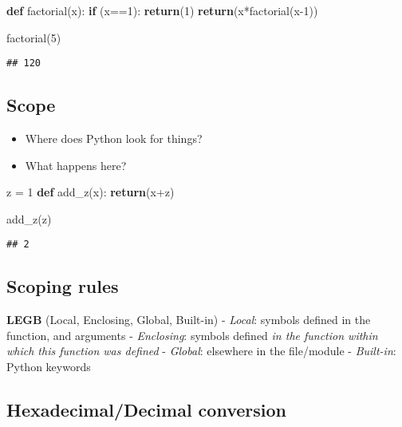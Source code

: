 \documentclass[]{tufte-handout}
\newenvironment{Shaded}{}{}
\newcommand{\KeywordTok}[1]{\textcolor[rgb]{0.00,0.44,0.13}{\textbf{{#1}}}}
\newcommand{\DecValTok}[1]{\textcolor[rgb]{0.25,0.63,0.44}{{#1}}}
\newcommand{\ControlFlowTok}[1]{\textcolor[rgb]{0.00,0.44,0.13}{\textbf{{#1}}}}
\newcommand{\OperatorTok}[1]{\textcolor[rgb]{0.40,0.40,0.40}{{#1}}}
\newcommand{\NormalTok}[1]{{#1}}
\providecommand{\tightlist}{%
  \setlength{\itemsep}{0pt}\setlength{\parskip}{0pt}}
\begin{document}
\begin{Shaded}
\begin{Highlighting}[]
\KeywordTok{def} \NormalTok{factorial(x):}
    \ControlFlowTok{if} \NormalTok{(x}\OperatorTok{==}\DecValTok{1}\NormalTok{):}
        \ControlFlowTok{return}\NormalTok{(}\DecValTok{1}\NormalTok{)}
    \ControlFlowTok{return}\NormalTok{(x}\OperatorTok{*}\NormalTok{factorial(x}\DecValTok{-1}\NormalTok{))}

\NormalTok{factorial(}\DecValTok{5}\NormalTok{)}
\end{Highlighting}
\end{Shaded}

\begin{verbatim}
## 120
\end{verbatim}

\subsection{Scope}\label{scope}

\begin{itemize}
\tightlist
\item
  Where does Python look for things?
\item
  What happens here?
\end{itemize}

\begin{Shaded}
\begin{Highlighting}[]
\NormalTok{z }\OperatorTok{=} \DecValTok{1}
\KeywordTok{def} \NormalTok{add_z(x):}
    \ControlFlowTok{return}\NormalTok{(x}\OperatorTok{+}\NormalTok{z)}

\NormalTok{add_z(z)}
\end{Highlighting}
\end{Shaded}

\begin{verbatim}
## 2
\end{verbatim}

\subsection{Scoping rules}\label{scoping-rules}

\textbf{LEGB} (Local, Enclosing, Global, Built-in) - \emph{Local}:
symbols defined in the function, and arguments - \emph{Enclosing}:
symbols defined \emph{in the function within which this function was
defined} - \emph{Global}: elsewhere in the file/module -
\emph{Built-in}: Python keywords

\subsection{Hexadecimal/Decimal
conversion}\label{hexadecimaldecimal-conversion}
\end{document}
